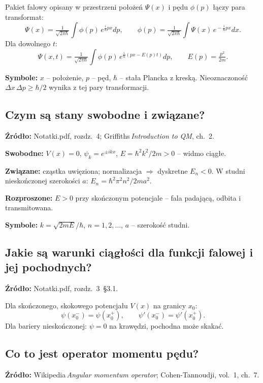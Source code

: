 		Pakiet falowy opisany w przestrzeni położeń $\Psi(x)$ i pędu $\phi(p)$ łączy
		para transformat:
		\[
		\boxed{\Psi(x)=\tfrac{1}{\sqrt{2\pi\hbar}}\!\int\!\phi(p)\,e^{\tfrac{i}{\hbar}px}dp},\qquad
		\boxed{\phi(p)=\tfrac{1}{\sqrt{2\pi\hbar}}\!\int\!\Psi(x)\,e^{\! -\tfrac{i}{\hbar}px}dx}.
		\]
		Dla dowolnego $t$:
		\[
		\Psi(x,t)=\tfrac{1}{\sqrt{2\pi\hbar}}\!\int\!\phi(p)\,e^{\tfrac{i}{\hbar}(px-E(p)t)}dp,\qquad E(p)=\tfrac{p^{2}}{2m}.
		\]
		
		\textbf{Symbole:} $x$ – położenie, $p$ – pęd, $\hbar$ – stała Plancka z kreską.
		Nieoznaczoność $\Delta x\,\Delta p \ge \hbar/2$ wynika z tej pary transformacji.

\subsection{Czym są stany swobodne i związane?}

\textbf{Źródło:} Notatki.pdf, rozdz.~4; Griffiths\,\emph{Introduction to QM}, ch.~2.
		
		\textbf{Swobodne:} $V(x)=0$, $\psi_k=e^{\pm ikx}$, $E=\hbar^{2}k^{2}/2m>0$ – widmo ciągłe.
		
		\textbf{Związane:} cząstka uwięziona; normalizacja $\Rightarrow$ dyskretne $E_n<0$.
		W studni nieskończonej szerokości $a$: $E_n=\hbar^{2}\pi^{2}n^{2}/2ma^{2}$.
		
		\textbf{Rozproszone:} $E>0$ przy skończonym potencjale – fala padającą, odbita i transmitowana.
		
		\textbf{Symbole:} $k=\sqrt{2mE}/\hbar$, $n=1,2,\dots$, $a$ – szerokość studni.

\subsection{Jakie są warunki ciągłości dla funkcji falowej i jej pochodnych?}

\textbf{Źródło:} Notatki.pdf, rozdz.~3~\S3.1.
		
		Dla skończonego, skokowego potencjału $V(x)$ na granicy $x_0$:
		\[
		\psi(x_0^-) = \psi(x_0^+),\qquad
		\psi'(x_0^-) = \psi'(x_0^+).
		\]
		Dla bariery nieskończonej: $\psi=0$ na krawędzi, pochodna może skakać.

\subsection{Co to jest operator momentu pędu?}

\textbf{Źródło:} Wikipedia\,\emph{Angular momentum operator}; Cohen-Tannoudji, vol.~1, ch.~7.
		
